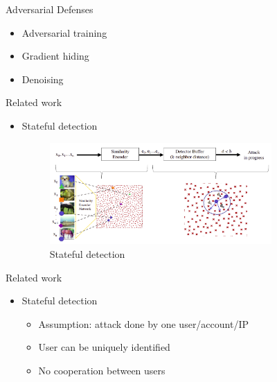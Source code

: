 \documentclass[11pt,t]{beamer}
\begin{document}
\begin{frame}{Adversarial Defenses}
\begin{itemize}
	\item Adversarial training
	\item Gradient hiding
	\item Denoising
\end{itemize}

\end{frame}

\begin{frame}{Related work}
	\begin{itemize}
	\item Stateful detection
	
		\begin{figure}
		\centering
		\includegraphics[width=0.8\textwidth]{graphics/stateful_detection.png}
		\caption{Stateful detection \cite{chen2019stateful}	
		\label{fig:stateful_detection}}
		\footnotesize
		\flushleft
		\end{figure}
	\end{itemize}
\end{frame}

\begin{frame}{Related work}
\begin{itemize}
	\item Stateful detection
	\begin{itemize}
		\item Assumption: attack done by \alert{one} user/account/IP
		\item User can be uniquely identified
		\item No cooperation between users
	\end{itemize}
\end{itemize}
\end{frame}
\end{document}

